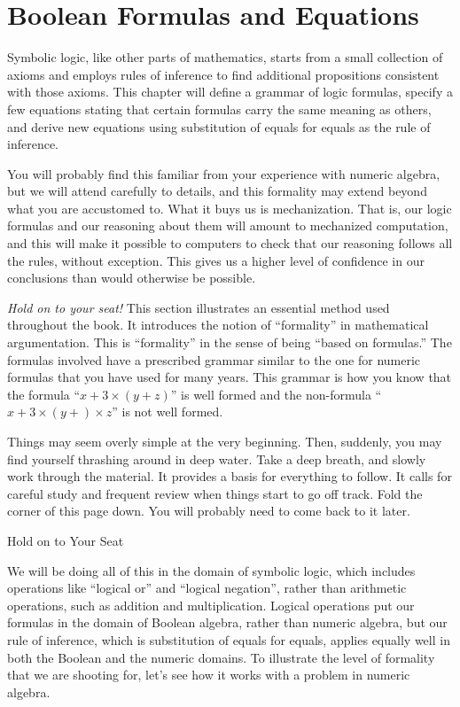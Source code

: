 \chapter{Boolean Formulas and Equations}
\label{ch:Boolean-Formulas}

Symbolic logic, like other parts of mathematics, starts from a small
collection of axioms and employs rules of inference to find
additional propositions consistent with those axioms. This
chapter will define a grammar of logic formulas, specify a few
equations stating that certain formulas carry the same meaning as others,
and derive new equations
using substitution of equals for equals as the rule of
inference.

You will probably find this familiar from your
experience with numeric algebra, but we will attend carefully
to details, and this formality may extend beyond what you are
accustomed to. What it buys us is mechanization. That is, our
logic formulas and our reasoning about them will amount to
mechanized computation, and this will make it possible to
computers to check that our reasoning follows all the rules,
without exception. This gives us a higher level of confidence
in our conclusions than would otherwise be possible.

\begin{aside}
\emph{Hold on to your seat!} This section illustrates an essential method used throughout the book. It introduces the notion of ``formality'' in mathematical argumentation. This is ``formality'' in the sense of being ``based on formulas.'' The formulas involved have a prescribed grammar similar to the one for numeric formulas that you have used for many years. This grammar is how you know that the formula ``$x+3\times(y + z)$'' is well formed and the non-formula
``$x+3\times(y + ) \times z$'' is not well formed.

Things may seem overly simple at the very beginning. Then, suddenly, you may find yourself thrashing around in deep water. Take a deep breath, and slowly work  through the material.
It provides a basis for everything to follow. It calls for careful study and frequent review when things start to go off track. Fold the corner of this page down. You will probably need to come back to it later.

\caption{Hold on to Your Seat}
\label{aside-hold-on-to-seat}
\end{aside}

We will be doing all of this in the domain of symbolic logic, which
includes operations like ``logical or'' and ``logical negation'',
rather than arithmetic operations, such as addition and
multiplication. Logical operations put our formulas in the
domain of Boolean algebra, rather than numeric algebra, but
our rule of inference, which is substitution of equals for equals,
applies equally well in both the Boolean and the numeric
domains. To illustrate the level of formality that we are
shooting for, let's see how it works with a problem in numeric algebra.

